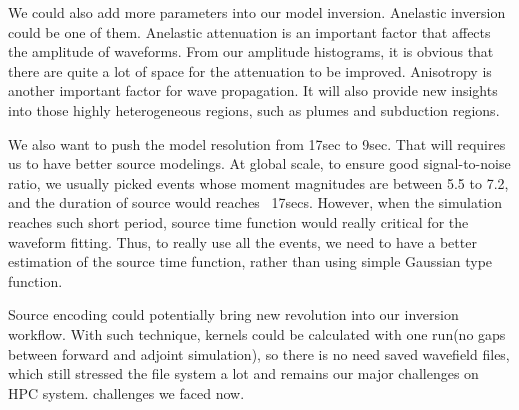 We could also add more parameters into our model inversion. Anelastic inversion
could be one of them. Anelastic attenuation is an important factor that affects
the amplitude of waveforms. From our amplitude histograms, it is obvious that 
there are quite a lot of space for the attenuation to be improved. Anisotropy
is another important factor for wave propagation. It will also provide new insights
into those highly heterogeneous regions, such as plumes and subduction regions.

We also want to push the model resolution from 17sec to 9sec. That will requires us
to have better source modelings. At global scale,
to ensure good signal-to-noise ratio, we usually picked events whose moment
magnitudes are between 5.5 to 7.2, and the duration of source would reaches ~17secs.
However, when the simulation reaches such short period, source time function
would really critical for the waveform fitting. Thus, to really use all the events,
we need to have a better estimation of the source time function, rather than using
simple Gaussian type function.

Source encoding could potentially bring new revolution into our inversion workflow. With such
technique, kernels could be calculated with one run(no gaps between forward and adjoint
simulation), so there is no need saved wavefield files, which still stressed the file system
a lot and remains our major challenges on HPC system.
challenges we faced now.
